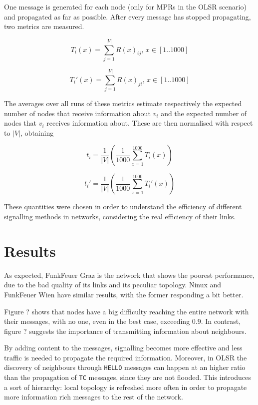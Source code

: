 \documentclass[oneside,openany]{memoir}
\newcommand{\figref}[1] {Figure\,\ref{#1}}
\begin{document}
One message is generated for each node (only for MPRs in the OLSR
scenario) and propagated as far as possible. After every message has
stopped propagating, two metrics are measured.

\begin{equation}
T_i(x) = \sum_{j=1}^{|V|} R(x)_{ij},\, x \in [1..1000]
\end{equation}

\begin{equation}
T_i'(x) = \sum_{j=1}^{|V|} R(x)_{ji},\, x \in [1..1000]
\end{equation}

The averages over all runs of these metrics estimate respectively the
expected number of nodes that receive information about $v_i$ and the
expected number of nodes that $v_i$ receives information about. These
are then normalised with respect to $|V|$, obtaining

\begin{equation}
t_i = \frac{1}{|V|}
      \left( \frac{1}{1000} \sum_{x=1}^{1000} T_i(x) \right)
\end{equation}

\begin{equation}
t_i' = \frac{1}{|V|}
       \left( \frac{1}{1000} \sum_{x=1}^{1000} T_i'(x) \right)
\end{equation}

These quantities were chosen in order to understand the efficiency of
different signalling methods in networks, considering the real
efficiency of their links.

\section{Results}\label{signalling-results}

As expected, FunkFeuer Graz is the network that shows the poorest performance,
due to the bad quality of its links and its peculiar topology. Ninux and
FunkFeuer Wien have similar results, with the former responding a bit better.

Figure ?%
shows that nodes have a big difficulty reaching the entire network with their
messages, with no one, even in the best case, exceeding 0.9.
In contrast, figure ?%
suggests the importance of transmitting information about neighbours.

By adding content to the messages, signalling becomes more effective and
less traffic is needed to propagate the required information.
Moreover, in OLSR the discovery of neighbours through \texttt{HELLO}
messages can happen at an higher ratio than the propagation of \texttt{TC}
messages, since they are not flooded.
This introduces a sort of hierarchy: local topology is refreshed more often
in order to propagate more information rich messages to the rest of the network.
\end{document}
